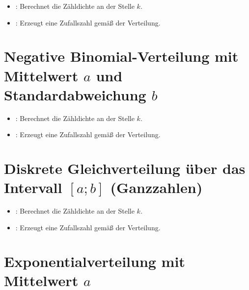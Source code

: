 \begin{itemize}

\item
{}:
Berechnet die Zähldichte an der Stelle $k$.


\item
{}:
Erzeugt eine Zufallszahl gemäß der Verteilung.

\end{itemize}



\section{Negative Binomial-Verteilung mit Mittelwert \texorpdfstring{$a$}{a} und Standardabweichung \texorpdfstring{$b$}{b}}

\begin{itemize}

\item
{}:
Berechnet die Zähldichte an der Stelle $k$.


\item
{}:
Erzeugt eine Zufallszahl gemäß der Verteilung.

\end{itemize}



\section{Diskrete Gleichverteilung über das Intervall \texorpdfstring{$[a;b]$}{[a;b]} (Ganzzahlen)}

\begin{itemize}

\item
{}:
Berechnet die Zähldichte an der Stelle $k$.

\item
{}:
Erzeugt eine Zufallszahl gemäß der Verteilung.

\end{itemize}



\section{Exponentialverteilung mit Mittelwert \texorpdfstring{$a$}{a}}

